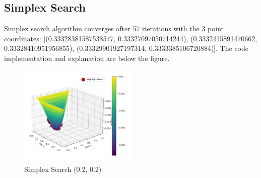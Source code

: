 \documentclass{article}
\begin{document}
        \subsection*{Simplex Search}
        Simplex search algorithm converges after 57 iterations with the 3 point coordinates: [(0.33328381587538547, 0.33327097050714244), (0.3332415891470662, 0.33328410951956855), (0.33329901927197314, 0.3333385106720884)]. The code implementation and explanation are below the figure.
        \begin{figure}[H]
            \centering
            \includegraphics[width=0.5\textwidth]{simplex-02.png}
            \caption{Simplex Search (0.2, 0.2)}
        \end{figure}
\end{document}
